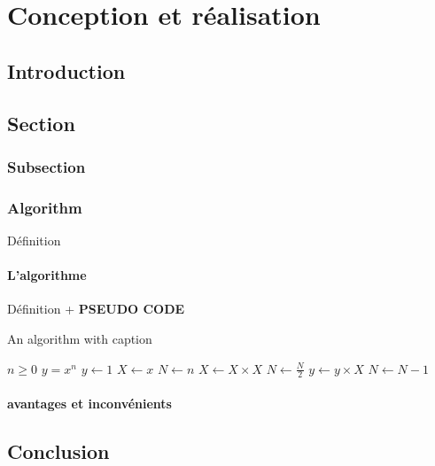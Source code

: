 \chapter{Conception et réalisation}

\section{Introduction}

\section{Section} 
\subsection{Subsection}
\subsection{Algorithm}
Définition
\subsubsection{L'algorithme }
Définition + \textbf{PSEUDO CODE}

\begin{algorithm}
\caption{An algorithm with caption}\label{alg:a}
\begin{algorithmic}
\Require $n \geq 0$
\Ensure $y = x^n$
\State $y \gets 1$
\State $X \gets x$
\State $N \gets n$
    \State $X \gets X \times X$
    \State $N \gets \frac{N}{2}$  
    \State $y \gets y \times X$
    \State $N \gets N - 1$
\EndIf
\EndWhile
\end{algorithmic}
\end{algorithm}

\subsubsection{avantages et inconvénients}
\section{Conclusion}
